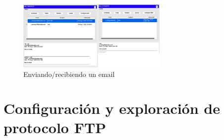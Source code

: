 \documentclass[10pt]{article}
\begin{document}
\begin{figure}[H]
    \centering
    \includegraphics[width=0.65\textwidth]{lab-01-screenshots/45-4-send-receive.png}
    \caption{Enviando/recibiendo un email}
\end{figure}


\section{Configuración y exploración de protocolo FTP}
\end{document}
